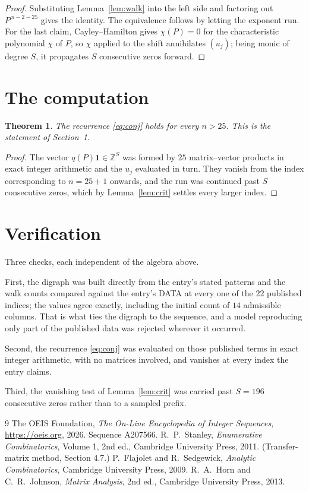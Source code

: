 \documentclass[11pt,a4paper]{article}
\theoremstyle{plain}
\newtheorem{theorem}{Theorem}
\theoremstyle{definition}
\begin{document}
\begin{proof}
Substituting Lemma~\ref{lem:walk} into the left side and factoring out
$P^{\,n-2-25}$ gives the identity. The equivalence follows by letting the exponent
run. For the last claim, Cayley--Hamilton gives $\chi(P)=0$ for the characteristic
polynomial $\chi$ of $P$, so $\chi$ applied to the shift annihilates $(u_j)$; being monic of
degree $S$, it propagates $S$ consecutive zeros forward.
\end{proof}

\section{The computation}

\begin{theorem}
The recurrence \eqref{eq:conj} holds for every $n>25$. This is the statement of
Section~1.
\end{theorem}

\begin{proof}
The vector $q(P)\mathbf{1}\in\mathbb{Z}^{S}$ was formed by $25$ matrix--vector
products in exact integer arithmetic and the $u_j$ evaluated in turn. They vanish from the
index corresponding to $n=25+1$ onwards, and the run was continued past $S$ consecutive
zeros, which by Lemma~\ref{lem:crit} settles every larger index.
\end{proof}

\section{Verification}

Three checks, each independent of the algebra above.

First, the digraph was built directly from the entry's stated patterns and the walk counts
compared against the entry's DATA at every one of the $22$ published indices; the
values agree exactly, including the initial count of $14$ admissible columns. That is
what ties the digraph to the sequence, and a model reproducing only part of the published
data was rejected wherever it occurred.

Second, the recurrence \eqref{eq:conj} was evaluated on those published terms in exact
integer arithmetic, with no matrices involved, and vanishes at every index the entry claims.

Third, the vanishing test of Lemma~\ref{lem:crit} was carried past $S=196$ consecutive
zeros rather than to a sampled prefix.

\begin{thebibliography}{9}
 The OEIS Foundation, \emph{The On-Line Encyclopedia of Integer
Sequences}, \url{https://oeis.org}, 2026. Sequence A207566.
 R.~P.~Stanley, \emph{Enumerative Combinatorics}, Volume 1, 2nd ed.,
Cambridge University Press, 2011. (Transfer-matrix method, Section 4.7.)
 P.~Flajolet and R.~Sedgewick, \emph{Analytic Combinatorics}, Cambridge
University Press, 2009.
 R.~A.~Horn and C.~R.~Johnson, \emph{Matrix Analysis}, 2nd ed., Cambridge
University Press, 2013.
\end{thebibliography}
\end{document}
